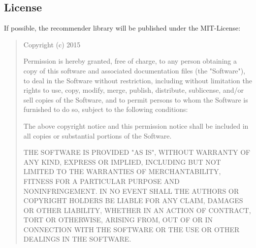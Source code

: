 \subsection{License}
If possible, the recommender library will be published under the MIT-License:\\

\begin{quote}
Copyright (c) 2015 \myAuthor

Permission is hereby granted, free of charge, to any person obtaining a copy of this software and associated documentation files (the "Software"), to deal in the Software without restriction, including without limitation the rights to use, copy, modify, merge, publish, distribute, sublicense, and/or sell copies of the Software, and to permit persons to whom the Software is furnished to do so, subject to the following conditions:

The above copyright notice and this permission notice shall be included in all copies or substantial portions of the Software.

THE SOFTWARE IS PROVIDED "AS IS", WITHOUT WARRANTY OF ANY KIND, EXPRESS OR IMPLIED, INCLUDING BUT NOT LIMITED TO THE WARRANTIES OF MERCHANTABILITY, FITNESS FOR A PARTICULAR PURPOSE AND NONINFRINGEMENT. IN NO EVENT SHALL THE AUTHORS OR COPYRIGHT HOLDERS BE LIABLE FOR ANY CLAIM, DAMAGES OR OTHER LIABILITY, WHETHER IN AN ACTION OF CONTRACT, TORT OR OTHERWISE, ARISING FROM, OUT OF OR IN CONNECTION WITH THE SOFTWARE OR THE USE OR OTHER DEALINGS IN THE SOFTWARE.
\end{quote}




